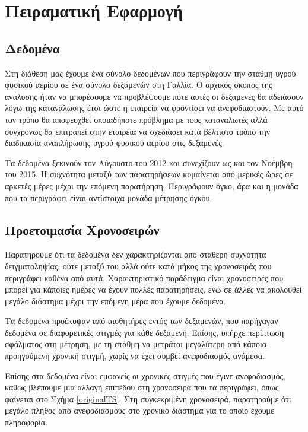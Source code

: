 \chapter{Πειραματική Εφαρμογή}
\label{chap5}

\section{Δεδομένα}

Στη διάθεση μας έχουμε ένα σύνολο δεδομένων που περιγράφουν την στάθμη υγρού φυσικού αερίου σε ένα σύνολο δεξαμενών στη Γαλλία. Ο αρχικός σκοπός της ανάλυσης ήταν να μπορέσουμε να προβλέψουμε πότε αυτές οι δεξαμενές θα αδειάσουν λόγω της κατανάλωσης έτσι ώστε η εταιρεία να φροντίσει να ανεφοδιαστούν. Με αυτό τον τρόπο θα αποφευχθεί οποιαδήποτε πρόβλημα με τους καταναλωτές αλλά συγχρόνως θα επιτραπεί στην εταιρεία να σχεδιάσει κατά βέλτιστο τρόπο την διαδικασία αναπλήρωσης υγρού φυσικού αερίου στις δεξαμενές.

Τα δεδομένα ξεκινούν τον Αύγουστο του 2012 και συνεχίζουν ως και τον Νοέμβρη του 2015. H συχνότητα μεταξύ των παρατηρήσεων κυμαίνεται από μερικές ώρες σε αρκετές μέρες μέχρι την επόμενη παρατήρηση. Περιγράφουν όγκο, άρα και η μονάδα που τα περιγράφει είναι αντίστοιχα μονάδα μέτρησης όγκου. 

\section{Προετοιμασία Χρονοσειρών}

Παρατηρούμε ότι τα δεδομένα δεν χαρακτηρίζονται από σταθερή συχνότητα δειγματοληψίας, ούτε μεταξύ του αλλά ούτε κατά μήκος της χρονοσειράς που περιγράφει καθένα από αυτά. Χαρακτηριστικό παράδειγμα είναι χρονοσειρές που μπορεί για κάποιες ημέρες να έχουν πολλές παρατηρήσεις, ενώ σε άλλες να ακολουθεί μεγάλο διάστημα μέχρι την επόμενη μέρα που έχουμε δεδομένα.

Τα δεδομένα προέκυψαν από αισθητήρες εντός των δεξαμενών, που παρήγαγαν δεδομένα σε διαφορετικές στιγμές για κάθε δεξαμενή. Επίσης, υπήρχε περίπτωση σφάλματος στη μέτρηση, με τη στάθμη να μετράται μεγαλύτερη από κάποια προηγούμενη χρονική στιγμή, χωρίς να έχει συμβεί ανεφοδιασμός ανάμεσα.

Επίσης στα δεδομένα είναι εμφανείς οι χρονικές στιγμές που έγινε ανεφοδιασμός, καθώς βλέπουμε μια αλλαγή επιπέδου στη χρονοσειρά που τα περιγράφει, όπως φαίνεται στο Σχήμα \ref{originalTS}. Στη συγκεκριμένη χρονοσειρά, παρατηρούμε ότι μεγάλο πλήθος από ανεφοδιασμούς στο χρονικό διάστημα για το οποίο έχουμε πληροφορία. 

